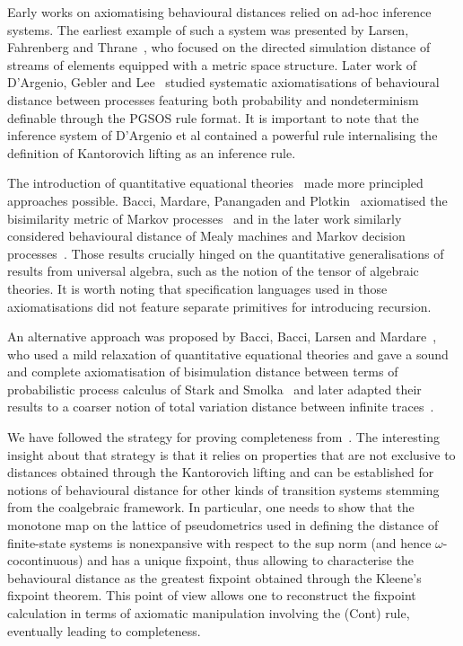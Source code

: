 Early works on axiomatising behavioural distances relied on ad-hoc inference systems. The earliest example of such a system was presented by Larsen, Fahrenberg and Thrane~\cite{Larsen:2011:Metrics}, who focused on the directed simulation distance of streams of elements equipped with a metric space structure. Later work of D'Argenio, Gebler and Lee~\cite{Argenio:2014:Axiomatizing} studied systematic axiomatisations of behavioural distance between processes featuring both probability and nondeterminism definable through the PGSOS rule format. It is important to note that the inference system of D'Argenio et al contained a powerful rule internalising the definition of Kantorovich lifting as an inference rule.

The introduction of quantitative equational theories~\cite{Mardare:2016:Quantitative} made more principled approaches possible. Bacci, Mardare, Panangaden and Plotkin~\cite{Bacci:2018:Algebraic} axiomatised the bisimilarity metric of Markov processes~\cite{Desharnais:2004:Metrics} and in the later work similarly considered behavioural distance of Mealy machines and Markov decision processes~\cite{Bacci:2024:Sum}. Those results crucially hinged on the quantitative generalisations of results from universal algebra, such as the notion of the tensor of algebraic theories. It is worth noting that specification languages used in those axiomatisations did not feature separate primitives for introducing recursion.

An alternative approach was proposed by Bacci, Bacci, Larsen and Mardare~\cite{Bacci:2018:Bisimilarity}, who used a mild relaxation of quantitative equational theories and gave a sound and complete axiomatisation of bisimulation distance between terms of probabilistic process calculus of Stark and Smolka~\cite{Stark:2000:Complete} and later adapted their results to a coarser notion of total variation distance between infinite traces~\cite{Bacci:2018:TV}. 

We have followed the strategy for proving completeness from~\cite{Bacci:2018:Bisimilarity}. The interesting insight about that strategy is that it relies on properties that are not exclusive to distances obtained through the Kantorovich lifting and can be established for notions of behavioural distance for other kinds of transition systems stemming from the coalgebraic framework. In particular, one needs to show that the monotone map on the lattice of pseudometrics used in defining the distance of finite-state systems is nonexpansive with respect to the sup norm (and hence $\omega$-cocontinuous) and has a unique fixpoint, thus allowing to characterise the behavioural distance as the greatest fixpoint obtained through the Kleene's fixpoint theorem. This point of view allows one to reconstruct the fixpoint calculation in terms of axiomatic manipulation involving the \textsf{(Cont)} rule, eventually leading to completeness.

